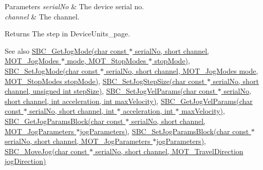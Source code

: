 \begin{DoxyParams}{Parameters}
{\em serial\+No} & The device serial no. \\
\hline
{\em channel} & The channel. \\
\hline
\end{DoxyParams}
\begin{DoxyReturn}{Returns}
The step in Device\+Units\+\_\+page. 
\end{DoxyReturn}
\begin{DoxySeeAlso}{See also}
\hyperlink{group___modular_stepper_ga7203ed6006c1bb5679e4bac63b2df747}{S\+B\+C\+\_\+\+Get\+Jog\+Mode(char const $\ast$ serial\+No, short channel, M\+O\+T\+\_\+\+Jog\+Modes $\ast$ mode, M\+O\+T\+\_\+\+Stop\+Modes $\ast$ stop\+Mode)}, \hyperlink{group___modular_stepper_ga9f677fcca5b3474c9855a896b40bd943}{S\+B\+C\+\_\+\+Set\+Jog\+Mode(char const $\ast$ serial\+No, short channel, M\+O\+T\+\_\+\+Jog\+Modes mode, M\+O\+T\+\_\+\+Stop\+Modes stop\+Mode)}, \hyperlink{group___modular_stepper_gaa34c709b2a1ff0418bf5c06c3c533f9a}{S\+B\+C\+\_\+\+Set\+Jog\+Step\+Size(char const $\ast$ serial\+No, short channel, unsigned int step\+Size)}, \hyperlink{group___modular_stepper_ga305932eea81f7311db96c71d4006020b}{S\+B\+C\+\_\+\+Set\+Jog\+Vel\+Params(char const $\ast$ serial\+No, short channel, int acceleration, int max\+Velocity)}, \hyperlink{group___modular_stepper_ga1b632302486b3617738b6767ad4e35a7}{S\+B\+C\+\_\+\+Get\+Jog\+Vel\+Params(char const $\ast$ serial\+No, short channel, int $\ast$ acceleration, int $\ast$ max\+Velocity)}, \hyperlink{group___modular_stepper_gaedd89dd377e3efe69f73fa5373a64ce0}{S\+B\+C\+\_\+\+Get\+Jog\+Params\+Block(char const $\ast$ serial\+No, short channel, M\+O\+T\+\_\+\+Jog\+Parameters $\ast$jog\+Parameters)}, \hyperlink{group___modular_stepper_gaec1871d4ee992f7aa6ce62e4c52925ba}{S\+B\+C\+\_\+\+Set\+Jog\+Params\+Block(char const $\ast$ serial\+No, short channel, M\+O\+T\+\_\+\+Jog\+Parameters $\ast$jog\+Parameters)}, \hyperlink{group___modular_stepper_ga301e0b3dca85f99240774daa6ae3dcf2}{S\+B\+C\+\_\+\+Move\+Jog(char const $\ast$ serial\+No, short channel, M\+O\+T\+\_\+\+Travel\+Direction jog\+Direction)}


\end{DoxySeeAlso}

\begin{DoxyCodeInclude}
\end{DoxyCodeInclude}
